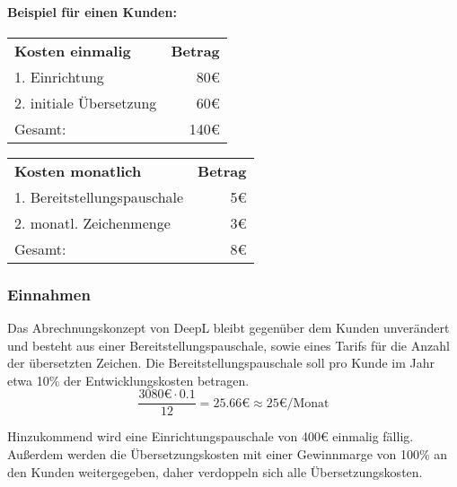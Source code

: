 \paragraph{Beispiel für einen Kunden:}
\begin{center}
    \begin{tabular}{l r}
        \textbf{Kosten einmalig} & \textbf{Betrag} \\
        1. Einrichtung & 80€ \\
        2. initiale Übersetzung\footnotemark[1] & 60€ \\
        \hline
        Gesamt: & 140€ \\
    \end{tabular}
    \hspace{2.9cm}
    \begin{tabular}{l r}
        \textbf{Kosten monatlich} & \textbf{Betrag} \\
        1. Bereitstellungspauschale\footnotemark[2] & 5€\\
        2. monatl. Zeichenmenge\footnotemark[1] & 3€\\
        \hline
        Gesamt: & 8€ \\
    \end{tabular}
\end{center}

\subsubsection{Einnahmen}
Das Abrechnungskonzept von DeepL bleibt gegenüber dem Kunden unverändert und besteht aus einer Bereitstellungspauschale, 
sowie eines Tarifs für die Anzahl der übersetzten Zeichen.
Die Bereitstellungspauschale soll pro Kunde im Jahr etwa 10\% der Entwicklungskosten betragen.
\[
    \frac{3080\text{€} \cdot 0.1}{12} = 25.66\text{€} \approx 25\text{€} / \text{Monat}
\]

Hinzukommend wird eine Einrichtungspauschale von 400€ einmalig fällig.
Außerdem werden die Übersetzungskosten mit einer Gewinnmarge von 100\% an den Kunden weitergegeben, daher verdoppeln sich alle Übersetzungskosten.


